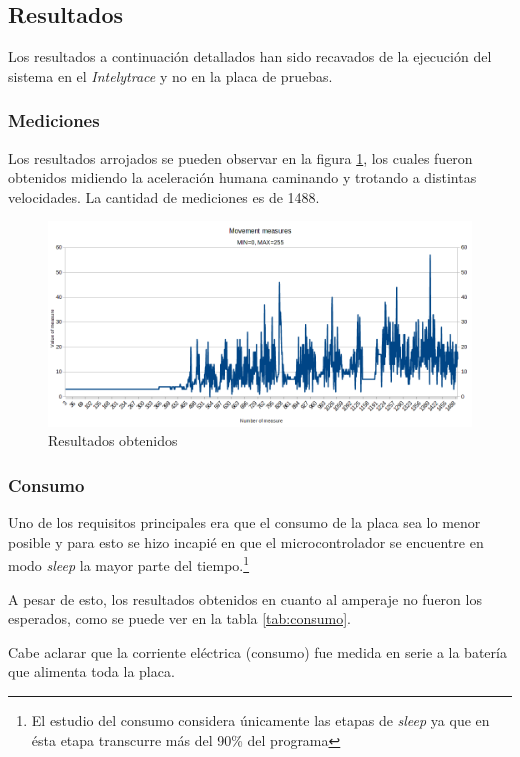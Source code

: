 \documentclass{article}
\newcommand{ \fnsleep }{\footnote{El estudio del consumo considera únicamente las etapas de \emph{sleep} ya que en ésta etapa transcurre más del 90\% del programa}}
\begin{document}
    \subsection{Resultados}
    Los resultados a continuación detallados han sido recavados de la ejecución
    del sistema en el \emph{Intelytrace} y no en la placa de pruebas.

    \subsubsection{Mediciones}
    Los resultados arrojados se pueden observar en la figura 
    \ref{fig:resultados_modulo}, los cuales fueron obtenidos midiendo la 
    aceleración humana caminando y trotando a distintas velocidades. La 
    cantidad de mediciones es de 1488.

    \begin{figure}[h]
        \includegraphics[width=1.0 \textwidth, center]{../segundas/results_module.png}
        \caption{Resultados obtenidos}
        \label{fig:resultados_modulo}
    \end{figure}

    \subsubsection{Consumo}
    Uno de los requisitos principales era que el consumo de la placa sea lo 
    menor posible y para esto se hizo incapié en que el microcontrolador se 
    encuentre en modo \emph{sleep} la mayor parte del tiempo.\fnsleep \par
    A pesar de esto, los resultados obtenidos en cuanto al amperaje no fueron
    los esperados, como se puede ver en la tabla \ref{tab:consumo}. \par
    Cabe aclarar que la corriente eléctrica (consumo) fue medida en serie
    a la batería que alimenta toda la placa.
\end{document}
